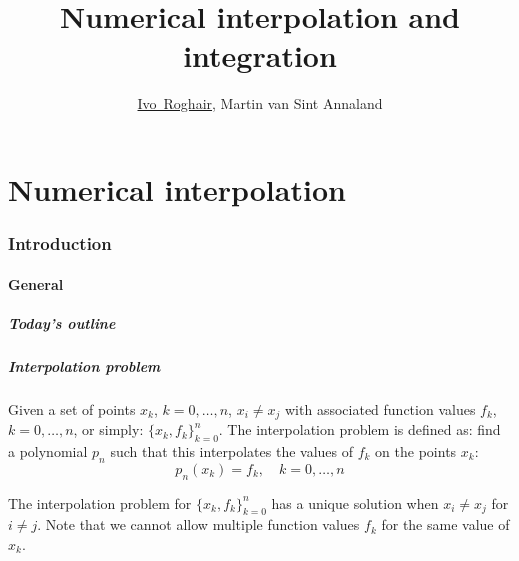 \documentclass[11pt,table,final,fleqn,xcolor={usenames,dvipsnames,table}]{beamer}
\title{Numerical interpolation and integration}
\author[I.~Roghair]{\underline{Ivo~Roghair}, Martin van Sint Annaland}
\institute[SPI]{{Chemical Process Intensification,\\
  Eindhoven University of Technology}}
\date
\begin{document}

\frame[plain]{
  \titlepage
}
\part{Numerical interpolation}
\frame{\partpage}
\section{Introduction}
\subsection*{General}
\begin{frame}[label=contents,nonavbar]
  \frametitle{Today's outline}
\end{frame}

\begin{frame}
  \frametitle{Interpolation problem}
  \begin{definition}
  Given a set of points $x_k$, $k=0,\ldots,n$, $x_i \neq x_j$ with associated function values $f_k$, $k=0,\ldots,n$, or simply: $\{x_k,f_k\}_{k=0}^n$. The interpolation problem is defined as: find a polynomial $p_n$ such that this interpolates the values of $f_k$ on the points $x_k$:
  \[
    p_n(x_k)=f_k, \quad k=0,\ldots,n
  \]
  \end{definition}
  \pause
  \begin{theorem}
    The interpolation problem for $\{x_k,f_k\}_{k=0}^n$ has a unique solution when $x_i \neq x_j$ for $i \neq j$. Note that we cannot allow multiple function values $f_k$ for the same value of $x_k$.
  \end{theorem}
\end{frame}
\end{document}

